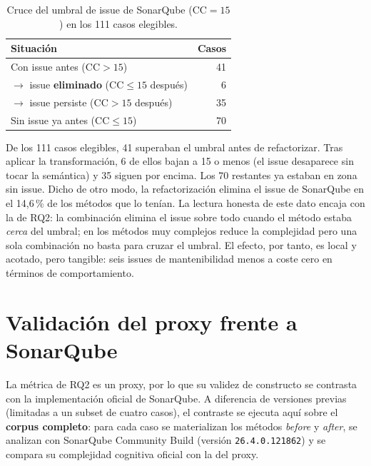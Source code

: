 \begin{table}[ht]
\centering
\caption{Cruce del umbral de issue de SonarQube ($\text{CC}=15$) en los 111
casos elegibles.}
\label{tab:issues-sonar}
\begin{tabular}{@{}lr@{}}
\toprule
\textbf{Situación} & \textbf{Casos} \\
\midrule
Con issue antes ($\text{CC}>15$)                 & 41 \\
\quad $\rightarrow$ issue \textbf{eliminado} ($\text{CC}\le 15$ después) & 6 \\
\quad $\rightarrow$ issue persiste ($\text{CC}>15$ después)             & 35 \\
Sin issue ya antes ($\text{CC}\le 15$)           & 70 \\
\bottomrule
\end{tabular}
\end{table}

De los 111 casos elegibles, 41 superaban el umbral antes de refactorizar. Tras
aplicar la transformación, 6 de ellos bajan a 15 o menos (el issue desaparece
sin tocar la semántica) y 35 siguen por encima. Los 70 restantes ya estaban en
zona sin issue. Dicho de otro modo, la refactorización elimina el issue de
SonarQube en el 14{,}6\,\% de los métodos que lo tenían. La lectura honesta de
este dato encaja con la de RQ2: la combinación elimina el issue sobre todo
cuando el método estaba \emph{cerca} del umbral; en los métodos muy complejos reduce la complejidad pero una sola
combinación no basta para cruzar el umbral. El efecto, por tanto, es local y
acotado, pero tangible: seis issues de mantenibilidad menos a coste cero en
términos de comportamiento.

\section{Validación del proxy frente a SonarQube}
\label{sec:resultados-sonar}
La métrica de RQ2 es un proxy, por lo que su validez de constructo se contrasta
con la implementación oficial de SonarQube. A diferencia de versiones previas
(limitadas a un subset de cuatro casos), el contraste se ejecuta aquí sobre el
\textbf{corpus completo}: para cada caso se materializan los métodos
\emph{before} y \emph{after}, se analizan con SonarQube Community Build
(versión \texttt{26.4.0.121862}) y se compara su complejidad cognitiva oficial
con la del proxy.

